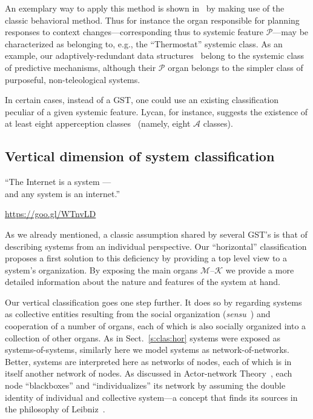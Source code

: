 \documentclass[twocolumn]{svjour3}
\def\M{\hbox{$\mathcal{M}$}}
\def\A{\hbox{$\mathcal{A}$}}
\def\P{\hbox{$\mathcal{P}$}}
\def\K{\hbox{$\mathcal{K}$}}
\begin{document}
An exemplary way to apply this method
is shown in~\cite{DF14b} by making use of the classic behavioral method. Thus for instance
the organ responsible for planning responses to context changes---corresponding thus
to systemic feature \P---may be characterized as belonging to, e.g., the ``Thermostat'' systemic class.
As an example, our adaptively-redundant data structures~\cite{DF13a} belong to
the systemic class of predictive mechanisms, although their \P{} organ belongs
to the simpler class of purposeful, non-teleological systems.

In certain cases, instead of
a GST, one could use an existing classification peculiar of a given systemic feature.
Lycan, for instance, suggests
the existence of at least eight apperception classes~\cite{Lycan96} (namely, eight
\A{} classes).



\subsection{Vertical dimension of system classification}\label{s:clas:ver}
\epigraph{``The Internet is a system --- \\and any system is an internet.''}
{\url{https://goo.gl/WTnvLD}}

As we already mentioned, a classic assumption shared by several GST's
is that of describing systems from an individual perspective. Our ``horizontal''
classification proposes a first solution to this deficiency by providing a top level view
to a system's organization. By exposing the main organs \M--\K{} we provide a more
detailed information about the nature and features of the system at hand.

Our vertical classification goes one step further.
It does so by regarding systems as collective entities
resulting from the social organization (\emph{sensu}~\cite{Bou56}) and cooperation of a number of organs,
each of which is also socially organized into a collection of other organs.
As in Sect.~\ref{s:clas:hor} systems were exposed as systems-of-systems, similarly here
we model systems as network-of-networks. Better, systems are interpreted here as networks of nodes,
each of which is in itself another network of nodes. As discussed in Actor-network Theory~\cite{Latour06},
each node ``blackboxes'' and ``individualizes'' its network by assuming the double
identity of individual and collective system---a concept that finds its sources in the
philosophy of Leibniz~\cite{DF14c}.
\end{document}
